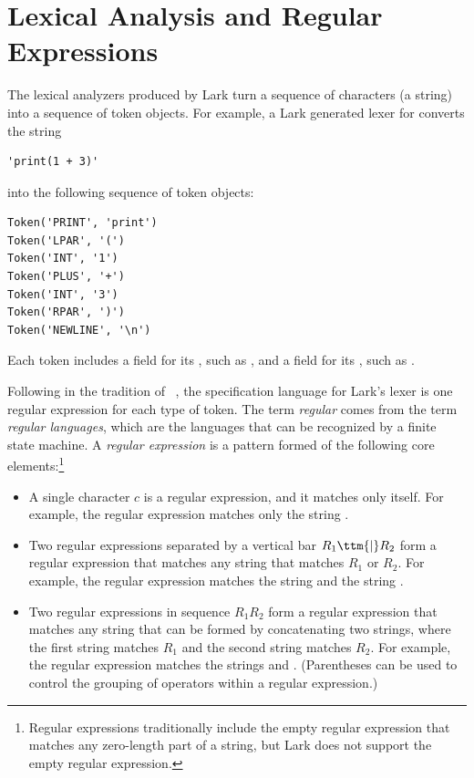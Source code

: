 \documentclass[7x10]{TimesAPriori_MIT}%
\numberwithin{theorem}{chapter}
\numberwithin{definition}{chapter}
\numberwithin{equation}{chapter}
\begin{document}
{\section{Lexical Analysis and Regular Expressions}
\label{sec:lex}

The lexical analyzers produced by Lark turn a sequence of characters
(a string) into a sequence of token objects. For example, a Lark
generated lexer for \LangInt{} converts the string
\begin{lstlisting}
'print(1 + 3)'
\end{lstlisting}
\noindent into the following sequence of token objects:
\begin{center}
\begin{minipage}{0.95\textwidth}
\begin{lstlisting}
Token('PRINT', 'print')
Token('LPAR', '(')
Token('INT', '1')
Token('PLUS', '+')
Token('INT', '3')
Token('RPAR', ')')
Token('NEWLINE', '\n')
\end{lstlisting}
\end{minipage}
\end{center}
Each token includes a field for its , such as ,
and a field for its , such as .

Following in the tradition of ~\citep{Lesk:1975uq}, the
specification language for Lark's lexer is one regular expression for
each type of token. The term \emph{regular} comes from the term
\emph{regular languages}, which are the languages that can be
recognized by a finite state machine. A \emph{regular expression} is a
pattern formed of the following core elements:\footnote{Regular expressions traditionally include the
  empty regular expression that matches any zero-length part of a
  string, but Lark does not support the empty regular expression.}
\begin{itemize}
\item A single character $c$ is a regular expression, and it matches
  only itself. For example, the regular expression  matches
  only the string .
  
\item Two regular expressions separated by a vertical bar $R_1 \ttm{|}
  R_2$ form a regular expression that matches any string that matches
  $R_1$ or $R_2$. For example, the regular expression 
  matches the string  and the string .

\item Two regular expressions in sequence $R_1 R_2$ form a regular
  expression that matches any string that can be formed by
  concatenating two strings, where the first string matches $R_1$ and
  the second string matches $R_2$. For example, the regular expression
   matches the strings  and .
  (Parentheses can be used to control the grouping of operators within
  a regular expression.)


\end{itemize}}
\end{document}
